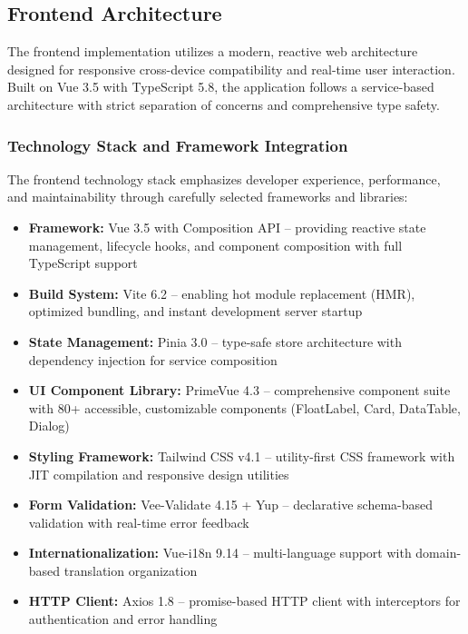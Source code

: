 \subsection{Frontend Architecture}
\label{subsec:frontend-architecture}

The frontend implementation utilizes a modern, reactive web architecture designed for responsive cross-device compatibility and real-time user interaction. Built on Vue 3.5 with TypeScript 5.8, the application follows a service-based architecture with strict separation of concerns and comprehensive type safety.

\subsubsection{Technology Stack and Framework Integration}

The frontend technology stack emphasizes developer experience, performance, and maintainability through carefully selected frameworks and libraries:

\begin{itemize}
    \item \textbf{Framework:} Vue 3.5 with Composition API -- providing reactive state management, lifecycle hooks, and component composition with full TypeScript support
    \item \textbf{Build System:} Vite 6.2 -- enabling hot module replacement (HMR), optimized bundling, and instant development server startup
    \item \textbf{State Management:} Pinia 3.0 -- type-safe store architecture with dependency injection for service composition
    \item \textbf{UI Component Library:} PrimeVue 4.3 -- comprehensive component suite with 80+ accessible, customizable components (FloatLabel, Card, DataTable, Dialog)
    \item \textbf{Styling Framework:} Tailwind CSS v4.1 -- utility-first CSS framework with JIT compilation and responsive design utilities
    \item \textbf{Form Validation:} Vee-Validate 4.15 + Yup -- declarative schema-based validation with real-time error feedback
    \item \textbf{Internationalization:} Vue-i18n 9.14 -- multi-language support with domain-based translation organization
    \item \textbf{HTTP Client:} Axios 1.8 -- promise-based HTTP client with interceptors for authentication and error handling
\end{itemize}


